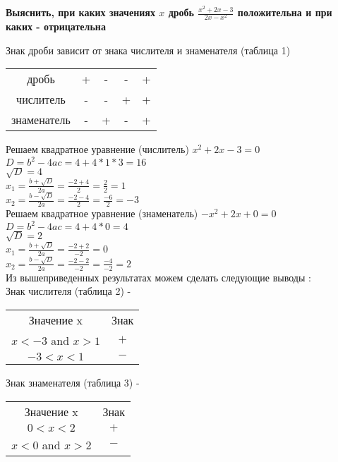 \documentclass{amsart}
\begin{document}
\textbf{Выяснить, при каких значениях $x$ дробь $\frac{x^2+2x-3}{2x-x^2}$ положительна и при каких - отрицательна}

Знак дроби зависит от знака числителя и знаменателя (таблица 1)
\begin{center}
\begin{tabular}{ c c c c c }
 \hline
 дробь & + & - & - & +  \\ 
 числитель & - & - & + & +  \\  
 знаменатель & - & + & - & + \\ 
 \hline   
\end{tabular}
\end{center}

Решаем квадратное уравнение (числитель) $x^2+2x-3=0$ \\
$D = b^2 - 4ac = 4 + 4 * 1 * 3 = 16$ \\
$\sqrt{D} = 4$ \\
$x_1 = \frac{b + \sqrt{D}}{2a} = \frac{-2 + 4}{2} = \frac{2}{2} = 1$ \\
$x_2 = \frac{b - \sqrt{D}}{2a} = \frac{-2 - 4}{2} = \frac{-6}{2} = -3$ \\

Решаем квадратное уравнение (знаменатель) $-x^2 + 2x + 0 = 0$ \\
$D = b^2 - 4ac = 4 + 4 * 0 = 4$ \\
$\sqrt{D} = 2$ \\
$x_1 = \frac{b + \sqrt{D}}{2a} = \frac{-2 + 2}{-2} = 0$ \\
$x_2 = \frac{b - \sqrt{D}}{2a} = \frac{-2 - 2}{-2} = \frac{-4}{-2} = 2$ \\

Из вышеприведенных результатах можем сделать следующие выводы : \\

Знак числителя (таблица 2) - \\
\begin{center}
 \begin{tabular}{c c}
 \hline
     Значение x & Знак \\
     $x < -3$ and $x > 1$ & $ + $ \\
     $-3 < x < 1$ & $ - $ \\ 
 \hline
 \end{tabular}
\end{center}

Знак знаменателя (таблица 3) - \\
\begin{center}
 \begin{tabular}{c c}
 \hline
     Значение x & Знак \\
     $0 < x < 2$ & $ + $ \\
     $x < 0$ and $x > 2$ & $ - $ \\ 
 \hline    
 \end{tabular}
\end{center}
\end{document}
